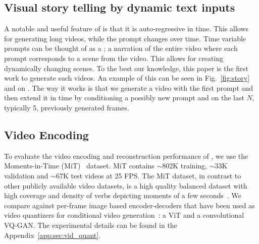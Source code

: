 \subsection{Visual story telling by dynamic text inputs}
A notable and useful feature of \phenaki is that it is auto-regressive in time. This allows for generating long videos, while the prompt changes over time. Time variable prompts can be thought of as a \textit{\story}; a narration of the entire video where each prompt corresponds to a scene from the video. This allows for creating dynamically changing scenes. To the best our knowledge, this paper is the first work to generate such videos. 
An example of this can be seen in Fig.~\ref{fig:story} and on \website. The way it works is that we generate a video with the first prompt and then extend it in time by conditioning a possibly new prompt and on the last $N$, typically 5, previously generated frames.

\subsection{Video Encoding}
\label{sec:vid_quant}
To evaluate the video encoding and reconstruction performance of \cvivit, we use the Moments-in-Time (MiT)~\citep{monfortmoments} dataset. MiT contains ${\sim}802$K training, ${\sim}33$K validation and ${\sim}67$K test videos at 25 FPS. The MiT dataset, in contrast to other publicly available video datasets, is a high quality balanced dataset with high coverage and density of verbs depicting moments of a few seconds~\cite{monfortmoments}. We compare \cvivit against per-frame image based encoder-decoders that have been used as video quantizers for conditional video generation~\citep{harp,nuwa,cogvideo,nuwa,cogvideo,godiva}: a ViT \cite{vit_vqgan} and a convolutional VQ-GAN\cite{vqgan}. The experimental details can be found in the Appendix~\ref{app:sec:vid_quant}. 



